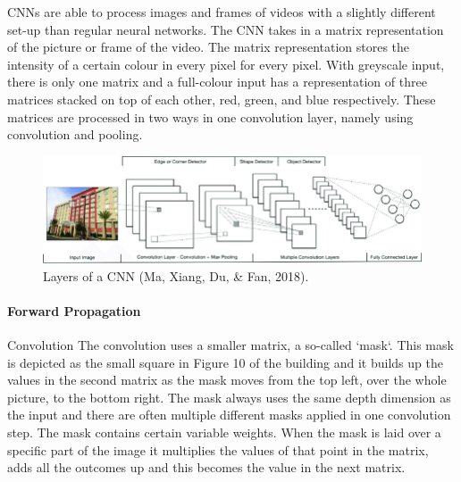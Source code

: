 CNNs are able to process images and frames of videos with a slightly different set-up than regular neural networks. The CNN takes in a matrix representation of the picture or frame of the video. The matrix representation stores the intensity of a certain colour in every pixel for every pixel. With greyscale input, there is only one matrix and a full-colour input has a representation of three matrices stacked on top of each other, red, green, and blue respectively. These matrices are processed in two ways in one convolution layer, namely using convolution and pooling. 

\begin{figure}[h]
	\includegraphics[width=\textwidth]{fig10.png} 
	\caption{Layers of a CNN (Ma, Xiang, Du, \& Fan, 2018).}
\end{figure}

\paragraph{Forward Propagation}
Convolution
The convolution uses a smaller matrix, a so-called `mask`. This mask is depicted as the small square in Figure 10 of the building and it builds up the values in the second matrix as the mask moves from the top left, over the whole picture, to the bottom right. The mask always uses the same depth dimension as the input and there are often multiple different masks applied in one convolution step. The mask contains certain variable weights. When the mask is laid over a specific part of the image it multiplies the values of that point in the matrix, adds all the outcomes up and this becomes the value in the next matrix. 

